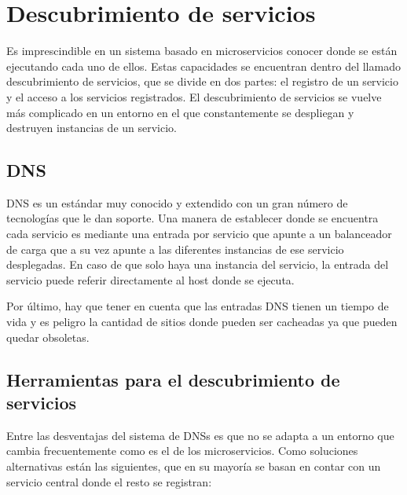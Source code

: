 \documentclass[11pt,a4paper]{article}
\begin{document}
\section{Descubrimiento de servicios}

Es imprescindible en un sistema basado en microservicios conocer donde se están ejecutando cada uno de ellos. Estas capacidades se encuentran dentro del llamado descubrimiento de servicios, que se divide en dos partes: el registro de un servicio y el acceso a los servicios registrados. El descubrimiento de servicios se vuelve más complicado en un entorno en el que constantemente se despliegan y destruyen instancias de un servicio.

\subsection{DNS}

DNS es un estándar muy conocido y extendido con un gran número de tecnologías que le dan soporte. Una manera de establecer donde se encuentra cada servicio es mediante una entrada por servicio que apunte a un balanceador de carga que a su vez apunte a las diferentes instancias de ese servicio desplegadas. En caso de que solo haya una instancia del servicio, la entrada del servicio puede referir directamente al host donde se ejecuta. 

Por último, hay que tener en cuenta que las entradas DNS tienen un tiempo de vida y es peligro la cantidad de sitios donde pueden ser cacheadas ya que pueden quedar obsoletas.

\subsection{Herramientas para el descubrimiento de servicios}

Entre las desventajas del sistema de DNSs es que no se adapta a un entorno que cambia frecuentemente como es el de los microservicios. Como soluciones alternativas están las siguientes, que en su mayoría se basan en contar con un servicio central donde el resto se registran:
\end{document}
